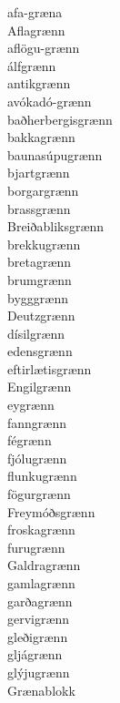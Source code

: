 \documentclass[../samsetningasafn.tex]{subfiles}
\begin{document}
\begin{bigwordlist}
\begin{footnotesize}
\begin{multicols}{4}
	\begin{description}
		\item [afa-græna]
		\item [Aflagrænn]
		\item [aflögu-grænn]
		\item [álfgrænn]
		\item [antikgrænn]
		\item [avókadó-grænn]
		\item [baðherbergisgrænn]
		\item [bakkagrænn]
		\item [baunasúpugrænn]
		\item [bjartgrænn]
		\item [borgargrænn]
		\item [brassgrænn]
		\item [Breiðabliksgrænn]
		\item [brekkugrænn]
		\item [bretagrænn]
		\item [brumgrænn]
		\item [bygggrænn]
		\item [Deutzgrænn]
		\item [dísilgrænn]
		\item [edensgrænn]
		\item [eftirlætisgrænn]
		\item [Engilgrænn]
		\item [eygrænn]
		\item [fanngrænn]
		\item [fégrænn]
		\item [fjólugrænn]
		\item [flunkugrænn]
		\item [fögurgrænn]
		\item [Freymóðsgrænn]
		\item [froskagrænn]
		\item [furugrænn]
		\item [Galdragrænn]
		\item [gamlagrænn]
		\item [garðagrænn]
		\item [gervigrænn]
		\item [gleðigrænn]
		\item [gljágrænn]
		\item [glýjugrænn]
		\item [Grænablokk]

\end{description}
\end{multicols}
\end{footnotesize}
\end{bigwordlist}
\end{document}
